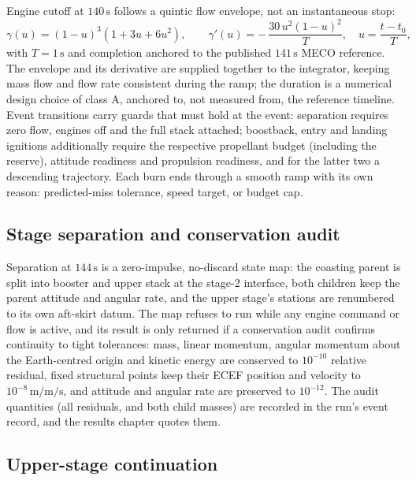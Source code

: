 Engine cutoff at $140\,\mathrm{s}$ follows a quintic flow envelope, not an
instantaneous stop:
%
\begin{equation}
\label{eq:quintic-shutdown}
\gamma(u) = (1-u)^3 (1 + 3u + 6u^2),
\qquad
\gamma'(u) = -\,\frac{30\,u^2 (1-u)^2}{T},
\quad u = \frac{t - t_0}{T},
\end{equation}
%
with $T = 1\,\mathrm{s}$ and completion anchored to the published
$141\,\mathrm{s}$ MECO reference. The envelope and its derivative are
supplied together to the integrator, keeping mass flow and flow rate
consistent during the ramp; the duration is a numerical design choice of
class A, anchored to, not measured from, the reference
timeline. Event transitions carry guards that must hold at the event:
separation requires zero flow, engines off and the full stack attached;
boostback, entry and landing ignitions additionally require the
respective propellant budget (including the reserve),
attitude readiness and propulsion readiness, and for the latter two a
descending trajectory. Each burn ends through a smooth ramp with its own
reason: predicted-miss tolerance, speed target, or budget cap.

\subsection{Stage separation and conservation audit}

Separation at $144\,\mathrm{s}$ is a zero-impulse, no-discard state map:
the coasting parent is split into booster and upper stack at the
stage-2 interface, both children keep the parent attitude and angular
rate, and the upper stage's stations are renumbered to its own aft-skirt
datum. The map refuses to run while any engine command or flow is active,
and its result is only returned if a conservation audit confirms
continuity to tight tolerances: mass, linear momentum, angular momentum
about the Earth-centred origin and kinetic energy are conserved to
$10^{-10}$ relative residual, fixed structural points keep their
ECEF position and velocity to $10^{-8}\,\mathrm{m/m/s}$, and attitude and
angular rate are preserved to $10^{-12}$. The audit quantities (all
residuals, and both child masses) are recorded in the run's event record,
and the results chapter quotes them.

\subsection{Upper-stage continuation}


